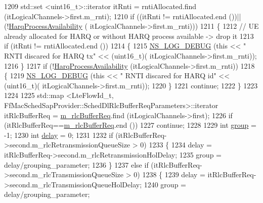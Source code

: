 \begin{DoxyCode}
1209       std::set <uint16\_t>::iterator itRnti = rntiAllocated.find (itLogicalChannels->first.m\_rnti);
1210       \textcolor{keywordflow}{if} ((itRnti != rntiAllocated.end ())||(!\hyperlink{classns3_1_1CqaFfMacScheduler_a166f5717872f7d411d168869881a4518}{HarqProcessAvailability} (
      itLogicalChannels->first.m\_rnti)))
1211         \{
1212           \textcolor{comment}{// UE already allocated for HARQ or without HARQ process available -> drop it}
1213           \textcolor{keywordflow}{if} (itRnti != rntiAllocated.end ())
1214             \{
1215               \hyperlink{group__logging_ga413f1886406d49f59a6a0a89b77b4d0a}{NS\_LOG\_DEBUG} (\textcolor{keyword}{this} << \textcolor{stringliteral}{" RNTI discared for HARQ tx"} << (uint16\_t)(
      itLogicalChannels->first.m\_rnti));
1216             \}
1217           \textcolor{keywordflow}{if} (!\hyperlink{classns3_1_1CqaFfMacScheduler_a166f5717872f7d411d168869881a4518}{HarqProcessAvailability} (itLogicalChannels->first.m\_rnti))
1218             \{
1219               \hyperlink{group__logging_ga413f1886406d49f59a6a0a89b77b4d0a}{NS\_LOG\_DEBUG} (\textcolor{keyword}{this} << \textcolor{stringliteral}{" RNTI discared for HARQ id"} << (uint16\_t)(
      itLogicalChannels->first.m\_rnti));
1220             \}
1221           \textcolor{keywordflow}{continue};
1222         \}
1223 
1224 
1225       std::map <LteFlowId\_t, FfMacSchedSapProvider::SchedDlRlcBufferReqParameters>::iterator itRlcBufferReq
       = \hyperlink{classns3_1_1CqaFfMacScheduler_ae9f6c7fc32e6dd08573470c70d827610}{m\_rlcBufferReq}.find (itLogicalChannels->first);
1226       \textcolor{keywordflow}{if} (itRlcBufferReq==\hyperlink{classns3_1_1CqaFfMacScheduler_ae9f6c7fc32e6dd08573470c70d827610}{m\_rlcBufferReq}.end ())
1227         \textcolor{keywordflow}{continue};
1228 
1229       \textcolor{keywordtype}{int} \hyperlink{namespacevisualizer_1_1higcontainer_aa6ad2b76790275bfce7783429beaa23f}{group} = -1;
1230       \textcolor{keywordtype}{int} \hyperlink{lte_2model_2fading-traces_2fading__trace__generator_8m_a7964e6aa8f61a9d28973c8267a606ad8}{delay} = 0;
1231 
1232       \textcolor{keywordflow}{if} (itRlcBufferReq->second.m\_rlcRetransmissionQueueSize > 0)
1233         \{
1234           delay = itRlcBufferReq->second.m\_rlcRetransmissionHolDelay;
1235           group = delay/grouping\_parameter;
1236         \}
1237       \textcolor{keywordflow}{else} \textcolor{keywordflow}{if}  (itRlcBufferReq->second.m\_rlcTransmissionQueueSize > 0)
1238         \{
1239           delay = itRlcBufferReq->second.m\_rlcTransmissionQueueHolDelay;
1240           group = delay/grouping\_parameter;

\end{DoxyCode}
